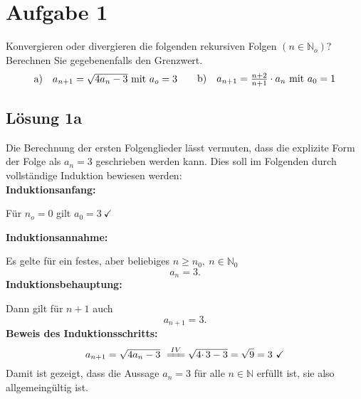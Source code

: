 \section{Aufgabe 1}

Konvergieren oder divergieren die folgenden rekursiven Folgen $\displaystyle ( n\in \mathbb{N}_{o})$? Berechnen Sie gegebenenfalls den Grenzwert.
\begin{align*}
  \begin{array}{ c c }
    \text{a)} & a_{n+1} =\sqrt{4a_{n} -3} \ \text{mit} \ a_{o} =3
  \end{array} & & \begin{array}{ c c }
    \text{b)} & a_{n+1} =\frac{n+2}{n+1} \cdot a_{n} \ \text{mit} \ a_{0} =1
  \end{array}
\end{align*}

\subsection{Lösung 1a}

Die Berechnung der ersten Folgenglieder lässt vermuten, dass die explizite Form der Folge als $\displaystyle a_{n} =3$ geschrieben werden kann. Dies soll im Folgenden durch vollständige Induktion bewiesen werden:\\

\textbf{Induktionsanfang: }

Für $\displaystyle n_{o} =0$ gilt $\displaystyle a_{0} =3\ \checkmark $

\textbf{Induktionsannahme:}

Es gelte für ein festes, aber beliebiges $\displaystyle n\geq n_{0} ,\ n\in \mathbb{N}_{0}$
\begin{equation*}
a_{n} =3\text{.}
\end{equation*}
\textbf{Induktionsbehauptung:}

Dann gilt für $\displaystyle n+1$ auch
\begin{equation*}
a_{n+1} =3\text{.}
\end{equation*}
\textbf{Beweis des Induktionsschritts:}
\begin{equation*}
a_{n+1} =\sqrt{4a_{n} -3} \ \xlongequal{IV}\sqrt{4\cdotp 3-3} =\sqrt{9} =3\ \checkmark 
\end{equation*}
Damit ist gezeigt, dass die Aussage $\displaystyle a_{n} =3$ für alle $\displaystyle n\in \mathbb{N}$ erfüllt ist, sie also allgemeingültig ist.\\

